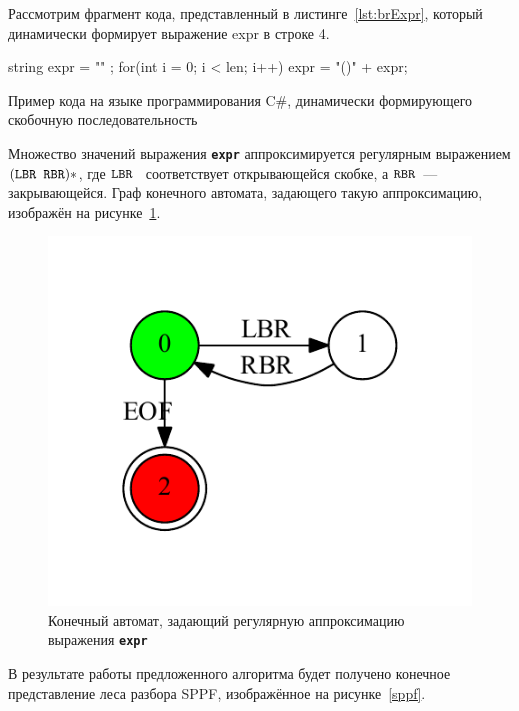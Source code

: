 Рассмотрим фрагмент кода, представленный в листинге~\ref{lst:brExpr}, который динамически формирует выражение expr в строке 4.

\begin{listing}
\begin{pyglist}[language=csharp,numbers=left,numbersep=5pt]
 string expr = "" ;
 for(int i = 0; i < len; i++) 
 {
     expr = "()" + expr;
 }
\end{pyglist}
\caption{Пример кода на языке программирования C\#, динамически формирующего скобочную последовательность}
\label{lst:brExpr}
\end{listing}

Множество значений выражения \textbf{\texttt{expr}} аппроксимируется регулярным выражением $(\mbox{\texttt{LBR }} \mbox{\texttt{RBR}})*$, где $\mbox{\texttt{LBR }}$ соответствует открывающейся скобке, а $\mbox{\texttt{RBR}}$~--- закрывающейся. Граф конечного автомата, задающего такую аппроксимацию, изображён на рисунке~\ref{input}.

\begin{figure}[!h]
 \centering
 \includegraphics[]{pics/input.pdf}
 \caption{Конечный автомат, задающий регулярную аппроксимацию выражения \textbf{\texttt{expr}}}
 \label{input}
\end{figure}

В результате работы предложенного алгоритма будет получено конечное представление леса разбора SPPF, изображённое на рисунке~\ref{sppf}.

